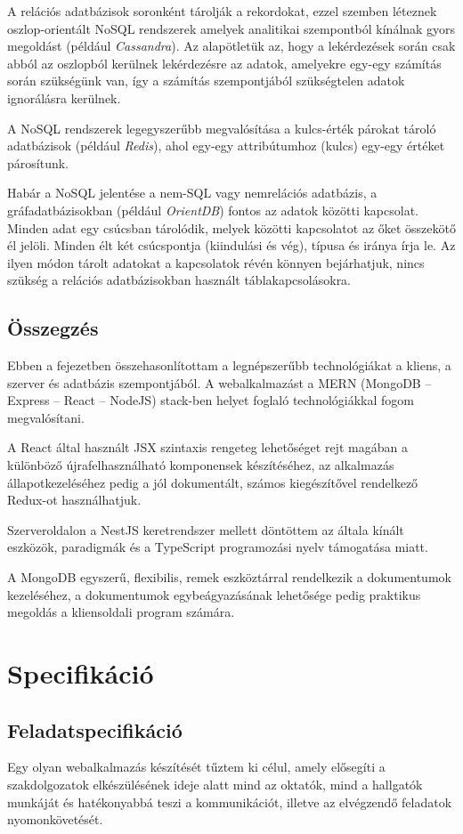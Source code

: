 \documentclass[
]{thesis-ekf}
\theoremstyle{definition}
\theoremstyle{remark}
\begin{document}
	A relációs adatbázisok soronként tárolják a rekordokat, ezzel szemben léteznek oszlop-orientált NoSQL rendszerek amelyek analitikai szempontból kínálnak gyors megoldást (például \emph{Cassandra}). Az alapötletük az, hogy a lekérdezések során csak abból az oszlopból kerülnek lekérdezésre az adatok, amelyekre egy-egy számítás során szükségünk van, így a számítás szempontjából szükségtelen adatok ignorálásra kerülnek.
	
	A NoSQL rendszerek legegyszerűbb megvalósítása a kulcs-érték párokat tároló adatbázisok (például \emph{Redis}), ahol egy-egy attribútumhoz (kulcs) egy-egy értéket párosítunk.
	
	Habár a NoSQL jelentése a nem-SQL vagy nemrelációs adatbázis, a gráfadatbázisokban (például \emph{OrientDB}) fontos az adatok közötti kapcsolat. Minden adat egy csúcsban tárolódik, melyek közötti kapcsolatot az őket összekötő él jelöli. Minden élt két csúcspontja (kiindulási és vég), típusa és iránya írja le. Az ilyen módon tárolt adatokat a kapcsolatok révén könnyen bejárhatjuk, nincs szükség a relációs adatbázisokban használt táblakapcsolásokra.
	
	\section{Összegzés}
	Ebben a fejezetben összehasonlítottam a legnépszerűbb technológiákat a kliens, a szerver és adatbázis szempontjából.
	A webalkalmazást a MERN (MongoDB -- Express -- React -- NodeJS) stack-ben helyet foglaló technológiákkal fogom megvalósítani.
	
	A React által használt JSX szintaxis rengeteg lehetőséget rejt magában a különböző újrafelhasználható komponensek készítéséhez, az alkalmazás állapotkezeléséhez pedig a jól dokumentált, számos kiegészítővel rendelkező Redux-ot használhatjuk.
	
	Szerveroldalon a NestJS keretrendszer mellett döntöttem az általa kínált eszközök, paradigmák és a TypeScript programozási nyelv támogatása miatt.
	
	A MongoDB egyszerű, flexibilis, remek eszköztárral rendelkezik a dokumentumok kezeléséhez, a dokumentumok egybeágyazásának lehetősége pedig praktikus megoldás a kliensoldali program számára.
	
	\chapter{Specifikáció}\label{chp:specifikacio}
	\section{Feladatspecifikáció}
	Egy olyan webalkalmazás készítését tűztem ki célul, amely elősegíti a szakdolgozatok elkészülésének ideje alatt mind az oktatók, mind a hallgatók munkáját és hatékonyabbá teszi a kommunikációt, illetve az elvégzendő feladatok nyomonkövetését.
	
\end{document}
